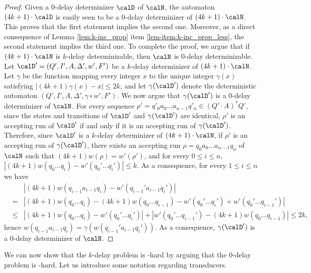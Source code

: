 \documentclass[a4paper]{article}
\begin{document}
\begin{proof}
	Given a $0$-delay
	determinizer $\calD$ of $\calN$, the automaton $(4k + 1) \cdot \calD$ is easily seen to be a
	$0$-delay determinizer of $(4k + 1) \cdot \calN$.
	This proves that the first statement implies the second one.
	Moreover, as a direct consequence of Lemma \ref{lem:k-inc_prop} item \ref{lem-item:k-inc_prop_less}, the second
	statement implies the third one.
	To complete the proof, we argue that if $(4k + 1) \cdot \calN$ is $k$-delay
	determinizable, then $\calN$ is $0$-delay determinizable.  Let $\calD' =
	(Q',I',A,\Delta',w',F')$ be a $k$-delay determinizer of $(4k + 1) \cdot
	\calN$. Let $\gamma$ be the function mapping every integer $x$ to the 
	unique integer $\gamma(x)$ satisfying $|(4k+1)\gamma(x) - x| \leq 2k$, and let $\gamma(\calD')$ denote the
	deterministic automaton $(Q',I',A,\Delta',\gamma \circ w', F')$. 
	We now argue that $\gamma(\calD')$ is a $0$-delay determinizer of $\calN$.
	For every sequence $\rho' = q'_0 a_0 \dots a_{n-1} q'_n \in (Q' \cdot A)^* Q'$, since the states and transitions of $\calD'$ and $\gamma(\calD')$ are identical, $\rho'$
	is an accepting run of $\calD'$ if and only if it is an accepting run of $\gamma(\calD')$.
	Therefore, since $\calD'$ is a $k$-delay determinizer of $(4k + 1) \cdot \calN$, if $\rho'$ is an accepting run of
	$\gamma(\calD')$, there exists an accepting run $\rho = q_0 a_0 \dots a_{n-1} q_n$ of $\calN$ such that $(4k + 1)w(\rho) =
	w'(\rho')$, and for every $0 \leq i \leq n$, $|(4k + 1)w(q_0 \dots q_i) - w'(q_0' \dots q_i')| \leq k$.
	As a consequence, for every $1 \leq i \leq n$ we have
	\[
	\begin{array}{lll}
	& & |(4k + 1)w(q_{i-1} a_{i-1} q_i) - w'(q_{i-1}' a_{i-1} q_{i}')|\\
	& = & |(4k + 1)w(q_0 \dots q_i) - (4k + 1)w(q_0 \dots q_{i-1}) - w'(q_0' \dots q_i') + w'(q_0' \dots q_{i-1}')|\\
	& \leq & |(4k + 1)w(q_0 \dots q_i) - w'(q_0' \dots q_i')| + |w'(q_0' \dots q_{i-1}') - (4k + 1)w(q_0 \dots q_{i-1})| \leq 2k,
	\end{array}
	\]
	hence $w(q_{i-1} a_{i-1} q_i) = \gamma(w(q_{i-1}' a_{i-1} q_{i}'))$. As a consequence, $\gamma(\calD')$ is a $0$-delay determinizer of $\calN$.
\end{proof}

We can now show that the $k$-delay problem is \EXP-hard by arguing that the
$0$-delay problem is \EXP-hard. Let us introduce some notation
regarding transducers.
\end{document}
